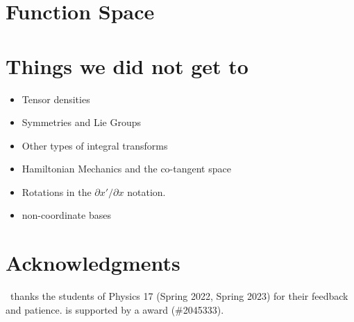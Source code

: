 \documentclass[12pt]{article}
\begin{document}
\section{Function Space}



\appendix

\section{Things we did not get to}
\begin{itemize}
\item Tensor densities
\item Symmetries and Lie Groups
\item Other types of integral transforms
\item Hamiltonian Mechanics and the co-tangent space
\item Rotations in the $\partial x'/\partial x$ notation.
\item non-coordinate bases
\end{itemize}




\section*{Acknowledgments}

\ thanks the students of Physics 17 (Spring 2022, Spring 2023) for their feedback and patience.
%
 is supported by a  award (\#2045333).



% 
\end{document}
